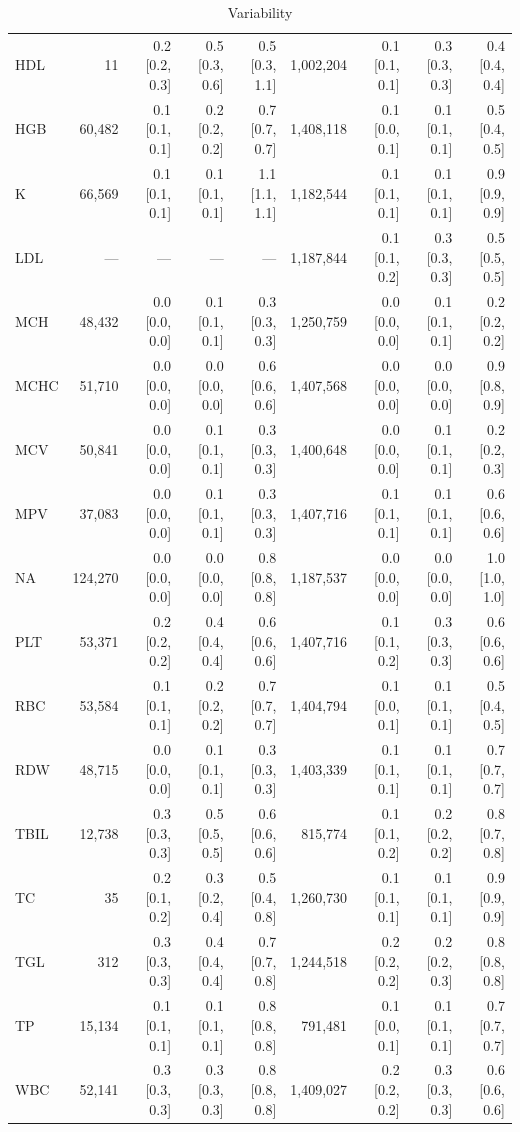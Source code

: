 \begin{table}[ht]
\begin{tabular}{lrrrrrrrr}
HDL & 11 & 0.2 [0.2, 0.3] & 0.5 [0.3, 0.6] & 0.5 [0.3, 1.1] & 1,002,204 & 0.1 [0.1, 0.1] & 0.3 [0.3, 0.3] & 0.4 [0.4, 0.4] \\
HGB & 60,482 & 0.1 [0.1, 0.1] & 0.2 [0.2, 0.2] & 0.7 [0.7, 0.7] & 1,408,118 & 0.1 [0.0, 0.1] & 0.1 [0.1, 0.1] & 0.5 [0.4, 0.5] \\
K & 66,569 & 0.1 [0.1, 0.1] & 0.1 [0.1, 0.1] & 1.1 [1.1, 1.1] & 1,182,544 & 0.1 [0.1, 0.1] & 0.1 [0.1, 0.1] & 0.9 [0.9, 0.9] \\
LDL & --- & --- & --- & --- & 1,187,844 & 0.1 [0.1, 0.2] & 0.3 [0.3, 0.3] & 0.5 [0.5, 0.5] \\
MCH & 48,432 & 0.0 [0.0, 0.0] & 0.1 [0.1, 0.1] & 0.3 [0.3, 0.3] & 1,250,759 & 0.0 [0.0, 0.0] & 0.1 [0.1, 0.1] & 0.2 [0.2, 0.2] \\
MCHC & 51,710 & 0.0 [0.0, 0.0] & 0.0 [0.0, 0.0] & 0.6 [0.6, 0.6] & 1,407,568 & 0.0 [0.0, 0.0] & 0.0 [0.0, 0.0] & 0.9 [0.8, 0.9] \\
MCV & 50,841 & 0.0 [0.0, 0.0] & 0.1 [0.1, 0.1] & 0.3 [0.3, 0.3] & 1,400,648 & 0.0 [0.0, 0.0] & 0.1 [0.1, 0.1] & 0.2 [0.2, 0.3] \\
MPV & 37,083 & 0.0 [0.0, 0.0] & 0.1 [0.1, 0.1] & 0.3 [0.3, 0.3] & 1,407,716 & 0.1 [0.1, 0.1] & 0.1 [0.1, 0.1] & 0.6 [0.6, 0.6] \\
NA & 124,270 & 0.0 [0.0, 0.0] & 0.0 [0.0, 0.0] & 0.8 [0.8, 0.8] & 1,187,537 & 0.0 [0.0, 0.0] & 0.0 [0.0, 0.0] & 1.0 [1.0, 1.0] \\
PLT & 53,371 & 0.2 [0.2, 0.2] & 0.4 [0.4, 0.4] & 0.6 [0.6, 0.6] & 1,407,716 & 0.1 [0.1, 0.2] & 0.3 [0.3, 0.3] & 0.6 [0.6, 0.6] \\
RBC & 53,584 & 0.1 [0.1, 0.1] & 0.2 [0.2, 0.2] & 0.7 [0.7, 0.7] & 1,404,794 & 0.1 [0.0, 0.1] & 0.1 [0.1, 0.1] & 0.5 [0.4, 0.5] \\
RDW & 48,715 & 0.0 [0.0, 0.0] & 0.1 [0.1, 0.1] & 0.3 [0.3, 0.3] & 1,403,339 & 0.1 [0.1, 0.1] & 0.1 [0.1, 0.1] & 0.7 [0.7, 0.7] \\
TBIL & 12,738 & 0.3 [0.3, 0.3] & 0.5 [0.5, 0.5] & 0.6 [0.6, 0.6] & 815,774 & 0.1 [0.1, 0.2] & 0.2 [0.2, 0.2] & 0.8 [0.7, 0.8] \\
TC & 35 & 0.2 [0.1, 0.2] & 0.3 [0.2, 0.4] & 0.5 [0.4, 0.8] & 1,260,730 & 0.1 [0.1, 0.1] & 0.1 [0.1, 0.1] & 0.9 [0.9, 0.9] \\
TGL & 312 & 0.3 [0.3, 0.3] & 0.4 [0.4, 0.4] & 0.7 [0.7, 0.8] & 1,244,518 & 0.2 [0.2, 0.2] & 0.2 [0.2, 0.3] & 0.8 [0.8, 0.8] \\
TP & 15,134 & 0.1 [0.1, 0.1] & 0.1 [0.1, 0.1] & 0.8 [0.8, 0.8] & 791,481 & 0.1 [0.0, 0.1] & 0.1 [0.1, 0.1] & 0.7 [0.7, 0.7] \\
WBC & 52,141 & 0.3 [0.3, 0.3] & 0.3 [0.3, 0.3] & 0.8 [0.8, 0.8] & 1,409,027 & 0.2 [0.2, 0.2] & 0.3 [0.3, 0.3] & 0.6 [0.6, 0.6] \\
\bottomrule
\end{tabular}
\caption{Variability}
\label{tab:variability}
\end{table}